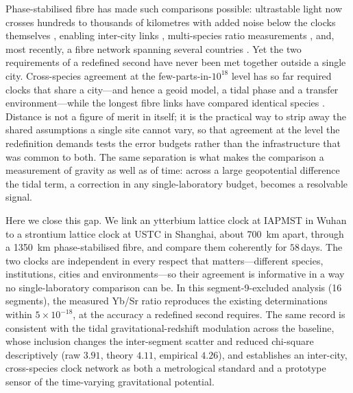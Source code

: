 \documentclass[11pt,a4paper]{article}
\begin{document}
Phase-stabilised fibre has made such comparisons possible: ultrastable
light now crosses hundreds to thousands of kilometres with added noise
below the clocks themselves \citep{schioppo2022cavities,
chen2026dissemination}, enabling inter-city links
\citep{lisdat2016network}, multi-species ratio measurements
\citep{beloy2021bacon}, and, most recently, a fibre network spanning
several countries \citep{pizzocaro2026european}. Yet the two requirements
of a redefined second have never been met together outside a single city.
Cross-species agreement at the few-parts-in-$10^{18}$ level has so far
required clocks that share a city---and hence a geoid model, a tidal
phase and a transfer environment---while the longest fibre links have
compared identical species
\citep{aeppli2026nist, lindvall2025coordinated, pizzocaro2026european}.
Distance is not a figure of merit in itself; it is the practical way to
strip away the shared assumptions a single site cannot vary, so that
agreement at the level the redefinition demands tests the error budgets
rather than the infrastructure that was common to both. The same
separation is what makes the comparison a measurement of gravity as well
as of time: across a large geopotential difference the tidal term, a
correction in any single-laboratory budget, becomes a resolvable signal.

Here we close this gap. We link an ytterbium lattice clock at IAPMST in
Wuhan to a strontium lattice clock at USTC in Shanghai, about
\qty{700}{km} apart, through a \qty{1350}{km} phase-stabilised fibre, and
compare them coherently for $58$\,days. The two clocks are independent in
every respect that matters---different species, institutions, cities and
environments---so their agreement is informative in a way no
single-laboratory comparison can be. In this segment-9-excluded analysis
(16 segments), the measured Yb/Sr ratio reproduces the existing
determinations within $5\times10^{-18}$, at the accuracy a redefined
second requires. The same record is consistent with the tidal
gravitational-redshift modulation across the baseline, whose inclusion
changes the inter-segment scatter and reduced chi-square descriptively
(raw $3.91$, theory $4.11$, empirical $4.26$), and establishes an
inter-city, cross-species clock network as both a metrological standard
and a prototype sensor of the time-varying gravitational potential.



\end{document}
